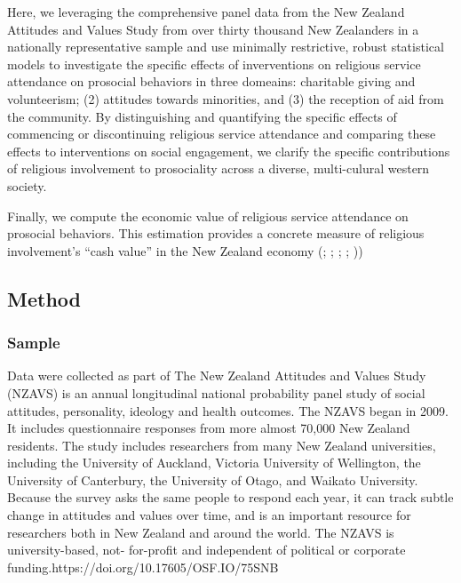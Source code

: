 \documentclass[
  singlecolumn]{article}
\begin{document}
Here, we leveraging the comprehensive panel data from the New Zealand
Attitudes and Values Study from over thirty thousand New Zealanders in a
nationally representative sample and use minimally restrictive, robust
statistical models to investigate the specific effects of inverventions
on religious service attendance on prosocial behaviors in three
domeains: charitable giving and volunteerism; (2) attitudes towards
minorities, and (3) the reception of aid from the community. By
distinguishing and quantifying the specific effects of commencing or
discontinuing religious service attendance and comparing these effects
to interventions on social engagement, we clarify the specific
contributions of religious involvement to prosociality across a diverse,
multi-culural western society.

Finally, we compute the economic value of religious service attendance
on prosocial behaviors. This estimation provides a concrete measure of
religious involvement's ``cash value'' in the New Zealand economy
(;
;
;
;
))

\subsection{Method}\label{method}

\subsubsection{Sample}\label{sample}

Data were collected as part of The New Zealand Attitudes and Values
Study (NZAVS) is an annual longitudinal national probability panel study
of social attitudes, personality, ideology and health outcomes. The
NZAVS began in 2009. It includes questionnaire responses from more
almost 70,000 New Zealand residents. The study includes researchers from
many New Zealand universities, including the University of Auckland,
Victoria University of Wellington, the University of Canterbury, the
University of Otago, and Waikato University. Because the survey asks the
same people to respond each year, it can track subtle change in
attitudes and values over time, and is an important resource for
researchers both in New Zealand and around the world. The NZAVS is
university-based, not- for-profit and independent of political or
corporate funding.https://doi.org/10.17605/OSF.IO/75SNB
\end{document}
